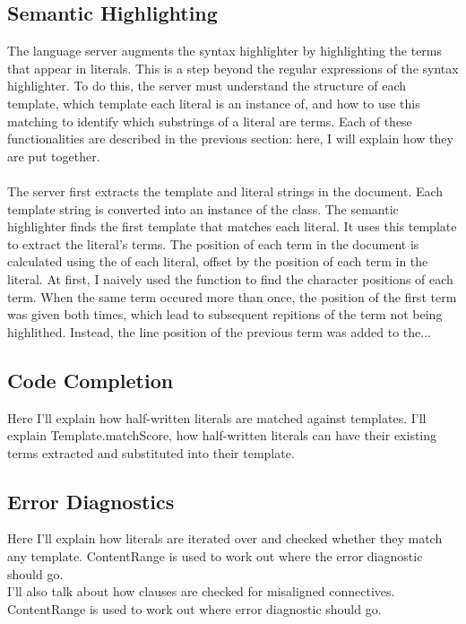 \documentclass[../main.tex]{subfiles}
\begin{document}
\subsection{Semantic Highlighting}
The language server augments the syntax highlighter by highlighting the terms that appear in literals. This is a step beyond the regular expressions of the syntax highlighter. To do this, the server must understand the structure of each template, which template each literal is an instance of, and how to use this matching to identify which substrings of a literal are terms. Each of these functionalities are described in the previous section: here, I will explain how they are put together.
\\ 
\\
The server first extracts the template and literal strings in the document. Each template string is converted into an instance of the  class.
The semantic highlighter finds the first template that matches each literal. 
 It uses this template to extract the literal's terms. The position of each term in the document is calculated using the  of each literal, offset by the position of each term in the literal. At first, I naively used the  function to find the character positions of each term. When the same term occured more than once, the position of the first term was given both times, which lead to subsequent repitions of the term not being highlithed. Instead, the line position of the previous term was added to the...


\subsection{Code Completion}
Here I'll explain how half-written literals are matched against templates. I'll explain Template.matchScore, how half-written literals can have their existing terms extracted and substituted into their template. 

\subsection{Error Diagnostics}
Here I'll explain how literals are iterated over and checked whether they match any template. ContentRange is used to work out where the error diagnostic should go.  \\ 
I'll also talk about how clauses are checked for misaligned connectives. ContentRange is used to work out where error diagnostic should go.
\end{document}
